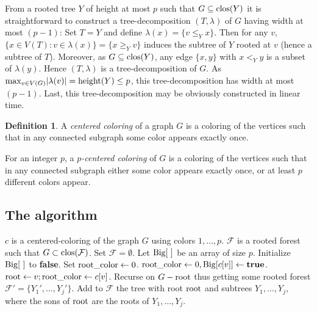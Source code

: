 \documentclass[a4paper]{amsart}
\theoremstyle{definition}
\newtheorem{definition}{Definition}[section]
\theoremstyle{remark}
\DeclareMathOperator\clos{{\rm clos}}
\DeclareMathOperator\height{{\rm height}}
\newcommand{\card}[1]{\lvert{#1}\rvert}
\begin{document}
From a rooted tree $Y$ of height at most $p$ such that
$G\subseteq\clos(Y)$ it is straightforward to construct a
tree-decomposition $(T,\lambda)$ of $G$ having width at most $(p-1)$:
Set $T=Y$ and define $\lambda(x)=\{v\leq _Y x\}$. Then for any $v$,
$\{x\in V(T): v\in\lambda(x)\}=\{x\geq_Y v\}$ induces the subtree of
$Y$ rooted at $v$ (hence a subtree of $T$). Moreover, as $G\subseteq\clos(Y)$, any edge
$\{x,y\}$ with $x<_Y y$ is a subset of $\lambda(y)$. Hence
$(T,\lambda)$ is a tree-decomposition of $G$. As $\max_{v\in
V(G)}\card{\lambda(v)}=\height(Y)\leq p$, this tree-decomposition has
width at most $(p-1)$. Last, this tree-decomposition may be obviously
constructed in linear time.

\begin{definition}
A {\em centered coloring} of a graph $G$ is a coloring of the vertices
such that in any connected subgraph some color appears exactly once.

For an integer $p$, a {\em $p$-centered coloring} of $G$ is a coloring
of the vertices such that in any connected subgraph either some color
appears exactly once, or at least $p$ different colors appear.
\end{definition}

\subsection{The algorithm}

\vspace{5mm}
\begin{algorithmic}
\REQUIRE $c$ is a centered-coloring of the graph $G$ using colors
$1,\dotsc,p$.
\ENSURE $\mathcal F$ is a rooted forest such that
$G\subset\clos(\mathcal F)$.
\STATE Set $\mathcal F=\emptyset$.
\STATE Let ${\rm Big}[\ ]$ be an array of size $p$.
\STATE Initialize  ${\rm Big}[\ ]$ to {\rm\bf false}.
\STATE Set ${\rm root\_color}\leftarrow 0$.
\STATE ${\rm  root\_color}\leftarrow 0, {\rm
Big}[c[v]]\leftarrow {\rm\bf true}$.
\ELSE 
\STATE ${\rm root}\leftarrow v; {\rm  root\_color}\leftarrow c[v]$.
\ENDIF
\ENDIF
\ENDFOR
\STATE Recurse on $G-{\rm root}$ thus getting some rooted forest $\mathcal
F'=\{Y_1',\dots,Y_j'\}$.
\STATE Add to $\mathcal F$ the tree with root ${\rm root}$ and subtrees
$Y_1,\dots,Y_j$, where the sons of ${\rm root}$ are the roots of
$Y_1,\dots,Y_j$.
\ENDFOR
\end{algorithmic}
\vspace{5mm}
\end{document}
